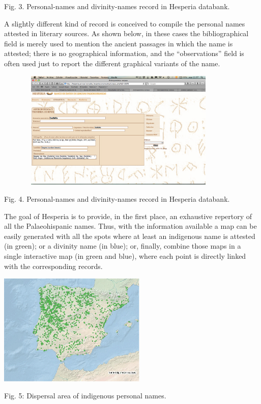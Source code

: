 \documentclass[amsthm,ebook]{saparticle}
\begin{document}
Fig. 3. Personal-names and divinity-names record in Hesperia databank.

A slightly different kind of record is conceived to compile the personal names attested in literary sources. As shown
below, in these cases the bibliographical field is merely used to mention the ancient passages in which the name is
attested; there is no geographical information, and the “observations” field is often used just to report the different
graphical variants of the name.

 \includegraphics[width=11.883cm,height=5.66cm]{EpigraphyandonomasticsinHesperiadatabanktemplate-img004.png} 

Fig. 4. Personal-names and divinity-names record in Hesperia databank.

The goal of Hesperia is to provide, in the first place, an exhaustive repertory of all the Palaeohispanic names. Thus,
with the information available a map can be easily generated with all the spots where at least an indigenous name is
attested (in green); or a divinity name (in blue); or, finally, combine those maps in a single interactive map (in
green and blue), where each point is directly linked with the corresponding records.

 \includegraphics[width=7.031cm,height=5.359cm]{EpigraphyandonomasticsinHesperiadatabanktemplate-img005.png} 

Fig. 5: Dispersal area of indigenous personal names.
\end{document}
